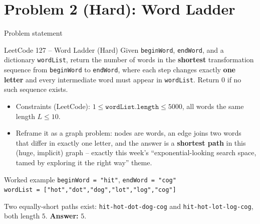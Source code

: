 \documentclass[11pt,aspectratio=169]{beamer}
\begin{document}
\section{Problem 2 (Hard): Word Ladder}

\begin{frame}{Problem statement}
  \begin{block}{LeetCode 127 -- Word Ladder (\textcolor{red!60!black}{Hard})}
    Given \texttt{beginWord}, \texttt{endWord}, and a dictionary \texttt{wordList},
    return the number of words in the \textbf{shortest} transformation sequence from
    \texttt{beginWord} to \texttt{endWord}, where each step changes exactly \textbf{one
    letter} and every intermediate word must appear in \texttt{wordList}. Return $0$ if
    no such sequence exists.
  \end{block}
  \begin{itemize}
    \item Constraints (LeetCode): $1 \le \texttt{wordList.length} \le 5000$, all words
    the same length $L \le 10$.
    \item Reframe it as a graph problem: nodes are words, an edge joins two words that
    differ in exactly one letter, and the answer is a \textbf{shortest path} in this
    (huge, implicit) graph -- exactly this week's ``exponential-looking search space,
    tamed by exploring it the right way'' theme.
  \end{itemize}
\end{frame}

\begin{frame}{Worked example}
  \small
  \texttt{beginWord = "hit"}, \texttt{endWord = "cog"}\\
  \texttt{wordList = ["hot","dot","dog","lot","log","cog"]}
  \begin{center}
  \end{center}
  Two equally-short paths exist: \texttt{hit-hot-dot-dog-cog} and
  \texttt{hit-hot-lot-log-cog}, both length $5$. \textbf{Answer:} $5$.
\end{frame}
\end{document}
